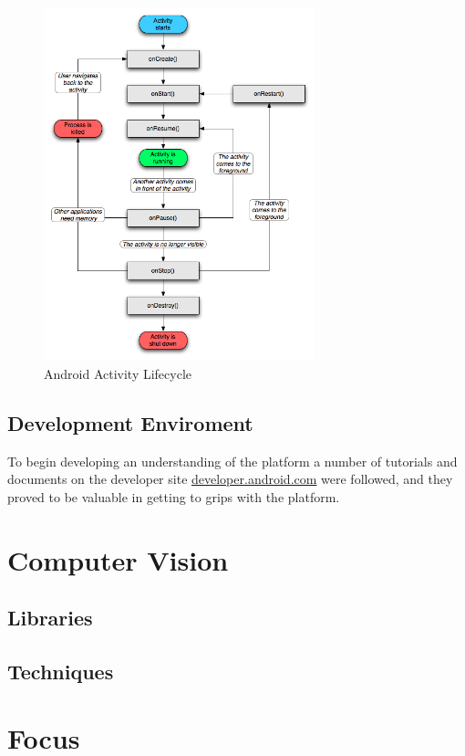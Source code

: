 \begin{figure}[h!]
\centering
    \includegraphics[width=0.7\textwidth]{research/images/activity_lifecycle.png}
    \caption{Android Activity Lifecycle}%
    \label{activity_lifecycle}
\end{figure}

\subsection{Development Enviroment}


To begin developing an understanding of the platform a number of tutorials and documents on the developer site \url{developer.android.com} were followed, and they proved to be valuable in getting to grips with the platform. 

\section{Computer Vision}

\subsection{Libraries}

\subsection{Techniques}

\section{Focus}
